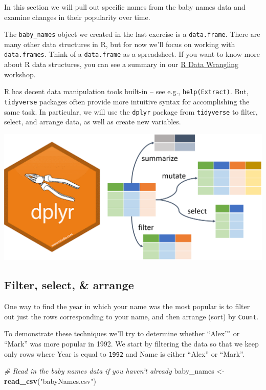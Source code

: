 \documentclass[]{book}
\newenvironment{Shaded}{\begin{snugshade}}{\end{snugshade}}
\newcommand{\CommentTok}[1]{\textcolor[rgb]{0.56,0.35,0.01}{\textit{#1}}}
\newcommand{\KeywordTok}[1]{\textcolor[rgb]{0.13,0.29,0.53}{\textbf{#1}}}
\newcommand{\NormalTok}[1]{#1}
\newcommand{\StringTok}[1]{\textcolor[rgb]{0.31,0.60,0.02}{#1}}
\begin{document}
In this section we will pull out specific names from the baby names data and
examine changes in their popularity over time.

The \texttt{baby\_names} object we created in the last exercise is a \texttt{data.frame}.
There are many other data structures in R, but for now we'll focus on
working with \texttt{data.frames}. Think of a \texttt{data.frame} as a spreadsheet.
If you want to know more about R data structures, you can see a summary
in our \href{./RDataWrangling.html\#data-types-and-structures}{R Data Wrangling} workshop.

R has decent data manipulation tools built-in -- see e.g.,
\texttt{help(Extract)}. But, \texttt{tidyverse} packages often provide
more intuitive syntax for accomplishing the same task. In
particular, we will use the \texttt{dplyr} package from \texttt{tidyverse}
to filter, select, and arrange data, as well as create new variables.

\includegraphics{R/Rintro/images/dplyr.png}

\hypertarget{filter-select-arrange}{%
\subsection{Filter, select, \& arrange}\label{filter-select-arrange}}

One way to find the year in which your name was the most popular
is to filter out just the rows corresponding to your name, and
then arrange (sort) by \texttt{Count}.

To demonstrate these techniques we'll try to determine whether
``Alex''" or ``Mark'' was more popular in 1992. We start by filtering the
data so that we keep only rows where Year is equal to \texttt{1992} and Name is
either ``Alex'' or ``Mark''.

\begin{Shaded}
\begin{Highlighting}[]
\CommentTok{# Read in the baby names data if you haven't already}
\NormalTok{baby_names <-}\StringTok{ }\KeywordTok{read_csv}\NormalTok{(}\StringTok{"babyNames.csv"}\NormalTok{)}
\end{Highlighting}
\end{Shaded}
\end{document}
